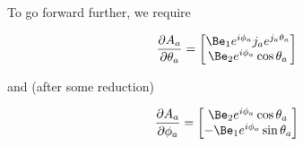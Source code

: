 To go forward further, we require

\begin{align}\label{eqn:multiPendulumSpherical2:boo10}
\PD{\theta_a}{A_a} &=
\begin{bmatrix}
\Be_1 e^{i \phi_a} j_a e^{j_a \theta_a} \\
\Be_2 e^{i \phi_a} \cos\theta_a
\end{bmatrix}
\end{align}

and (after some reduction)

\begin{align}\label{eqn:multiPendulumSpherical2:boo11}
\PD{\phi_a}{A_a}
&=
\begin{bmatrix}
\Be_2 e^{i \phi_a} \cos\theta_a \\
-\Be_1 e^{i \phi_a} \sin\theta_a
\end{bmatrix}
\end{align}

\EndNoBibArticle
